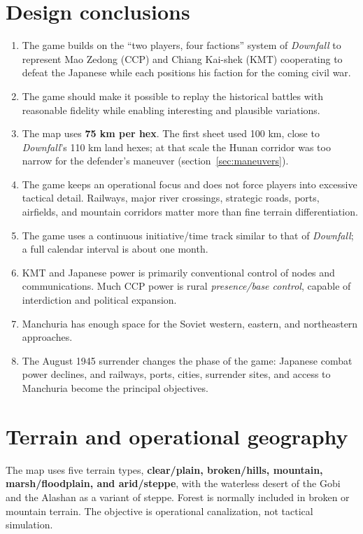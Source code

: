 \documentclass[11pt]{article}
\begin{document}
\section{Design conclusions}
\begin{enumerate}
\item The game builds on the ``two players, four factions'' system of \emph{Downfall} to represent Mao Zedong
(CCP) and Chiang Kai-shek (KMT) cooperating to defeat the Japanese while each positions his faction for the coming civil war.
\item The game should make it possible to replay the historical battles with reasonable fidelity while enabling 
interesting and plausible variations.
\item The map uses \textbf{75 km per hex}. The first sheet used 100 km, close to \emph{Downfall}'s 110 km land hexes; at that scale the Hunan corridor was too narrow for the defender's maneuver (section~\ref{sec:maneuvers}).
\item The game keeps an operational focus and does not force players into excessive tactical detail. Railways, major river crossings, strategic roads, ports, airfields, and mountain corridors matter more than fine terrain differentiation.
\item The game uses a continuous initiative/time track similar to that of \emph{Downfall}; a full calendar interval is about one month.
\item KMT and Japanese power is primarily conventional control of nodes and communications. Much CCP power is rural \emph{presence/base control}, capable of interdiction and political expansion.
\item Manchuria has enough space for the Soviet western, eastern, and northeastern approaches.
\item The August 1945 surrender changes the phase of the game: Japanese combat power declines, and railways, ports, cities, surrender sites, and access to Manchuria become the principal objectives.
\end{enumerate}

\section{Terrain and operational geography}
The map uses five terrain types, \textbf{clear/plain, broken/hills, mountain, marsh/floodplain, and arid/steppe}, with the waterless desert of the Gobi and the Alashan as a variant of steppe. Forest is normally included in broken or mountain terrain. The objective is operational canalization, not tactical simulation.
\end{document}
